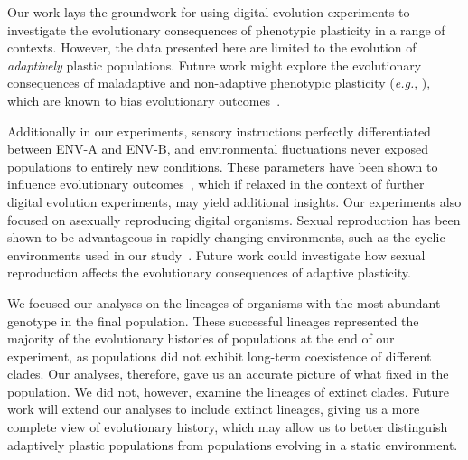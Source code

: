 \begin{raggedbottom}

Our work lays the groundwork for using digital evolution experiments to investigate the evolutionary consequences of phenotypic plasticity in a range of contexts.
However, the data presented here are limited to the evolution of \textit{adaptively} plastic populations.
Future work might explore the evolutionary consequences of maladaptive and non-adaptive phenotypic plasticity (\textit{e.g.}, \citealt{leroi_temperature_1994}), which are known to bias evolutionary outcomes~\citep{ghalambor_non-adaptive_2015}.

Additionally in our experiments, sensory instructions perfectly differentiated between ENV-A and ENV-B, and environmental fluctuations never exposed populations to entirely new conditions.
These parameters have been shown to influence evolutionary outcomes~\citep{li_digital_2004,boyer_adaptation_2021}, which if relaxed in the context of further digital evolution experiments, may yield additional insights.
Our experiments also focused on asexually reproducing digital organisms. 
Sexual reproduction has been shown to be advantageous in rapidly changing environments, such as the cyclic environments used in our study~\citep{misevic_experiments_2010}. 
Future work could investigate how sexual reproduction affects the evolutionary consequences of adaptive plasticity. 

We focused our analyses on the lineages of organisms with the most abundant genotype in the final population.
These successful lineages represented the majority of the evolutionary histories of populations at the end of our experiment, as populations did not exhibit long-term coexistence of different clades.
Our analyses, therefore, gave us an accurate picture of what fixed in the population.
We did not, however, examine the lineages of extinct clades.
Future work will extend our analyses to include extinct lineages, giving us a more complete view of evolutionary history, which may allow us to better distinguish adaptively plastic populations from populations evolving in a static environment.


\end{raggedbottom}
